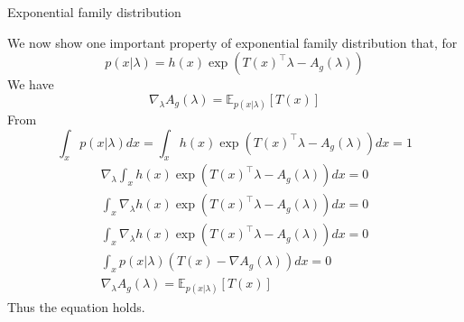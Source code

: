 \begin{frame}[allowframebreaks]{Exponential family distribution}
    \framebreak
    
    We now show one important property of exponential family distribution that, for $$p(x | \lambda) = h(x) \exp (T(x)^\top \lambda - A_g(\lambda))$$ We have $$\nabla_\lambda A_g(\lambda) = \mathbb{E}_{p(x | \lambda)}[T(x)]$$
    From 
    $$\int_x p(x | \lambda) dx = \int_x h(x) \exp (T(x)^\top \lambda - A_g(\lambda))dx = 1$$
    \begin{gather*}
    \nabla_\lambda \int_x h(x) \exp (T(x)^\top \lambda - A_g(\lambda))dx = 0 \\
    \int_x \nabla_\lambda h(x) \exp (T(x)^\top \lambda - A_g(\lambda))dx = 0 \\
    \int_x \nabla_\lambda h(x) \exp (T(x)^\top \lambda - A_g(\lambda))dx = 0 \\
    \int_x p(x | \lambda)(T(x) - \nabla A_g(\lambda))dx = 0 \\
    \nabla_\lambda A_g(\lambda) = \mathbb{E}_{p(x | \lambda)}[T(x)]
    \end{gather*}
    Thus the equation holds.
    
    \end{frame} 

